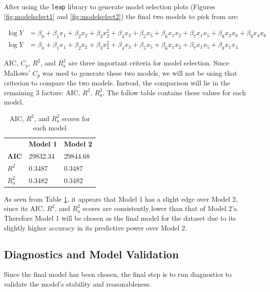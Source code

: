\documentclass{article}
\begin{document}
      After using the \texttt{leap} library to generate model selection plots
      (Figures \ref{fig:modelselect1} and \ref{fig:modelselect2}) the final two models
      to pick from are:

      \begin{align}
        \log{Y} &= \beta_0 + \beta_1 x_1 + \beta_2 x_2 + \beta_3 x_2^2 + \beta_4 x_3 + \beta_5 x_5 + \beta_6 x_1 x_2 + \beta_7 x_1 x_5 + \beta_8 x_3 x_6 + \beta_9 x_4 x_6 \\
        \log{Y} &= \beta_0 + \beta_1 x_1 + \beta_2 x_2 + \beta_3 x_2^2 + \beta_4 x_3 + \beta_5 x_5 + \beta_6 x_1 x_2 + \beta_7 x_1 x_5 + \beta_8 x_1 x_4
      \end{align}

      AIC, $C_p$, $R^2$, and $R_a^2$ are three important criteria for model selection.
      Since Mallows' $C_p$ was used to generate these two models, we will not be
      using that criterion to compare the two models. Instead, the comparison will
      lie in the remaining 3 factors: AIC, $R^2$, $R_a^2$. The follow table contains
      these values for each model.

      \begin{table}[]
        \centering
        \begin{tabular}{lll}
            & \textbf{Model 1}  & \textbf{Model 2}  \\
        \textbf{AIC} & 29832.34 & 29844.68 \\
        \textbf{$R^2$}  & 0.3487   & 0.3487   \\
        \textbf{$R_a^2$} & 0.3482   & 0.3482
        \end{tabular}
        \caption{AIC, $R^2$, and $R_a^2$ scores for each model}
        \label{tab:selection}
      \end{table}

      As seen from Table \ref{tab:selection}, it appears that Model 1 has a
      slight edge over Model 2, since its AIC, $R^2$, and $R_a^2$ scores are
      consistently lower than that of Model 2's. Therefore Model 1 will be chosen
      as the final model for the dataset due to its slightly higher accuracy
      in its predictive power over Model 2.

    \subsection{Diagnostics and Model Validation}
      Since the final model has been chosen, the final step is to run
      diagnostics to validate the model's stability and reasonableness.
\end{document}
